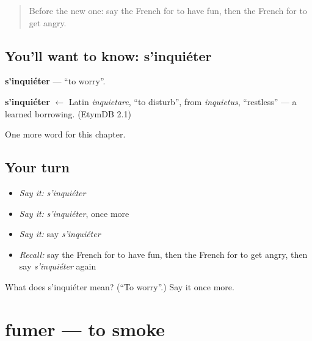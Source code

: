 \label{lesson:FR-C146-inquieter}



\begin{quote}
Before the new one: say the French for to have fun, then the French for to get angry.
\end{quote}

\subsection*{You'll want to know: s'inquiéter}
\textbf{s'inquiéter} — \textquotedblleft{}to worry\textquotedblright{}.

\begin{cousinweb}
\textbf{s'inquiéter} $\leftarrow$ Latin \emph{inquietare}, \textquotedblleft{}to disturb\textquotedblright{}, from \emph{inquietus}, \textquotedblleft{}restless\textquotedblright{} — a learned borrowing. (EtymDB 2.1)
\end{cousinweb}

\begin{grammarlens}[title={What you've built}]
One more word for this chapter.
\end{grammarlens}

\subsection*{Your turn}
\begin{itemize}
\raggedright
  \item \emph{Say it:} \emph{s'inquiéter}
  \item \emph{Say it:} \emph{s'inquiéter}, once more
  \item \emph{Say it:} say \emph{s'inquiéter}
  \item \emph{Recall:} say the French for to have fun, then the French for to get angry, then say \emph{s'inquiéter} again
\end{itemize}

\begin{tcolorbox}[breakable,colback=teal!4,colframe=teal!35!black,title={Before you move on}]
What does s'inquiéter mean? (\textquotedblleft{}To worry\textquotedblright{}.) Say it once more.
\end{tcolorbox}
\section[fumer]{fumer — to smoke}

\label{lesson:FR-C146-fumer}



